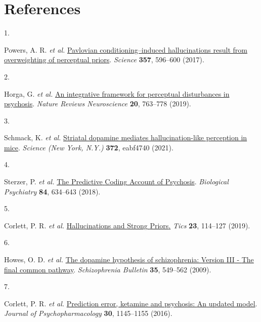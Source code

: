 \documentclass[
]{article}
\newlength{\cslhangindent}
\newlength{\csllabelwidth}
\newlength{\cslentryspacingunit} %
\newenvironment{CSLReferences}[2] %
 {%
  \setlength{\parindent}{0pt}
  \ifodd #1
  \let\oldpar\par
  \def\par{\hangindent=\cslhangindent\oldpar}
  \fi
  \setlength{\parskip}{#2\cslentryspacingunit}
 }%
 {}
\newcommand{\CSLLeftMargin}[1]{\parbox[t]{\csllabelwidth}{#1}}
\newcommand{\CSLRightInline}[1]{\parbox[t]{\linewidth - \csllabelwidth}{#1}\break}
\begin{document}
\newpage

\hypertarget{references}{%
\section*{References}\label{references}}

\hypertarget{refs}{}
\begin{CSLReferences}{0}{0}
\leavevmode{}%
\CSLLeftMargin{1. }%
\CSLRightInline{Powers, A. R. \emph{et al.}
\href{https://doi.org/10.1126/science.aan3458}{Pavlovian
conditioning--induced hallucinations result from overweighting of
perceptual priors}. \emph{Science} \textbf{357}, 596--600 (2017).}

\leavevmode{}%
\CSLLeftMargin{2. }%
\CSLRightInline{Horga, G. \emph{et al.}
\href{https://doi.org/10.1038/s41583-019-0234-1}{An integrative
framework for perceptual disturbances in psychosis}. \emph{Nature
Reviews Neuroscience} \textbf{20}, 763--778 (2019).}

\leavevmode{}%
\CSLLeftMargin{3. }%
\CSLRightInline{Schmack, K. \emph{et al.}
\href{https://doi.org/10.1126/science.abf4740}{Striatal dopamine
mediates hallucination-like perception in mice}. \emph{Science (New
York, N.Y.)} \textbf{372}, eabf4740 (2021).}

\leavevmode{}%
\CSLLeftMargin{4. }%
\CSLRightInline{Sterzer, P. \emph{et al.}
\href{https://doi.org/10.1016/j.biopsych.2018.05.015}{The {Predictive}
{Coding} {Account} of {Psychosis}}. \emph{Biological Psychiatry}
\textbf{84}, 634--643 (2018).}

\leavevmode{}%
\CSLLeftMargin{5. }%
\CSLRightInline{Corlett, P. R. \emph{et al.}
\href{https://doi.org/10.1016/j.tics.2018.12.001}{Hallucinations and
{Strong} {Priors}.} \emph{Tics} \textbf{23}, 114--127 (2019).}

\leavevmode{}%
\CSLLeftMargin{6. }%
\CSLRightInline{Howes, O. D. \emph{et al.}
\href{https://doi.org/10.1093/schbul/sbp006}{The dopamine hypothesis of
schizophrenia: {Version} {III} - {The} final common pathway}.
\emph{Schizophrenia Bulletin} \textbf{35}, 549--562 (2009).}

\leavevmode{}%
\CSLLeftMargin{7. }%
\CSLRightInline{Corlett, P. R. \emph{et al.}
\href{https://doi.org/10.1177/0269881116650087}{Prediction error,
ketamine and psychosis: {An} updated model}. \emph{Journal of
Psychopharmacology} \textbf{30}, 1145--1155 (2016).}


\end{CSLReferences}
\end{document}
